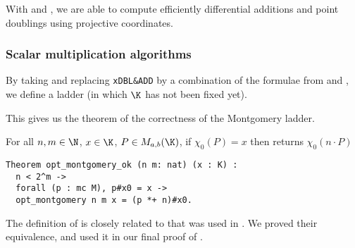 With  and , we are able to compute efficiently
differential additions and point doublings using projective coordinates.

\subsubsection{Scalar multiplication algorithms}
\label{subsec:ECC-ladder}

By taking  and replacing \texttt{xDBL\&ADD} by a
combination of the formulae from  and ,
we define a ladder  (in which $\K$ has not been fixed yet).

%

This gives us the theorem of the correctness of the Montgomery ladder.
\begin{theorem}
\label{thm:montgomery-ladder-correct}
For all $n, m \in \N$, $x \in \K$, $P \in M_{a,b}(\K)$,
if $\chi_0(P) = x$ then  returns $\chi_0(n \cdot P)$
\end{theorem}
\begin{lstlisting}[language=Coq]
Theorem opt_montgomery_ok (n m: nat) (x : K) :
  n < 2^m ->
  forall (p : mc M), p#x0 = x ->
  opt_montgomery n m x = (p *+ n)#x0.
\end{lstlisting}
The definition of  is closely related to 
that was used in .
We proved their equivalence, and used it in our
final proof of .


